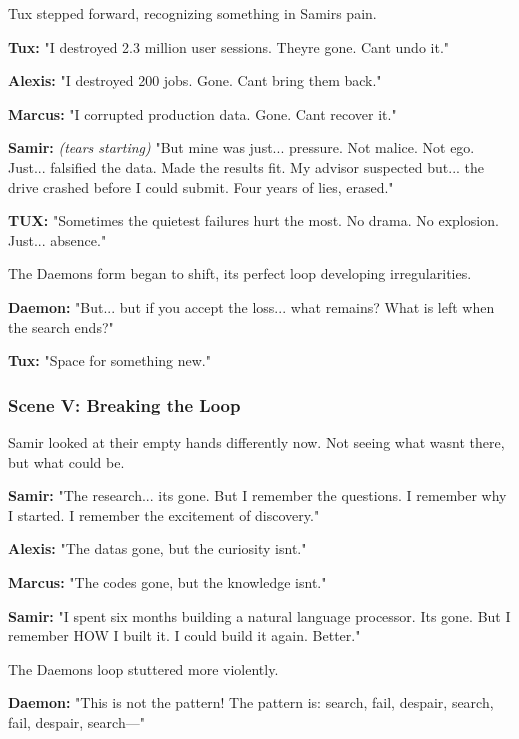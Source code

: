 Tux stepped forward, recognizing something in Samir\textquotesingle s pain.

\textbf{Tux:} "I destroyed 2.3 million user sessions. They\textquotesingle re gone. Can\textquotesingle t undo it."

\textbf{Alexis:} "I destroyed 200 jobs. Gone. Can\textquotesingle t bring them back."

\textbf{Marcus:} "I corrupted production data. Gone. Can\textquotesingle t recover it."

\textbf{Samir:} \emph{(tears starting)} "But mine was just... pressure. Not malice. Not ego. Just... falsified the data. Made the results fit. My advisor suspected but... the drive crashed before I could submit. Four years of lies, erased."

\textbf{TUX:} "Sometimes the quietest failures hurt the most. No drama. No explosion. Just... absence."

The Daemon\textquotesingle s form began to shift, its perfect loop developing irregularities.

\textbf{Daemon:} "But... but if you accept the loss... what remains? What is left when the search ends?"

\textbf{Tux:} "Space for something new."

\bookdivider

\subsubsection{Scene V: Breaking the Loop}\label{scene-v-breaking-the-loop}

Samir looked at their empty hands differently now. Not seeing what wasn\textquotesingle t there, but what could be.

\textbf{Samir:} "The research... it\textquotesingle s gone. But I remember the questions. I remember why I started. I remember the excitement of discovery."

\textbf{Alexis:} "The data\textquotesingle s gone, but the curiosity isn\textquotesingle t."

\textbf{Marcus:} "The code\textquotesingle s gone, but the knowledge isn\textquotesingle t."

\textbf{Samir:} "I spent six months building a natural language processor. It\textquotesingle s gone. But I remember HOW I built it. I could build it again. Better."

The Daemon\textquotesingle s loop stuttered more violently.

\textbf{Daemon:} "This is not the pattern! The pattern is: search, fail, despair, search, fail, despair, search---"

